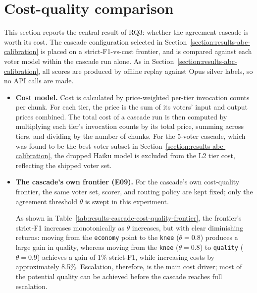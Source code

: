 \section{Cost-quality comparison}\label{section:results-cost-quality-comparison}

This section reports the central result of RQ3: whether the agreement cascade is worth its cost. The cascade configuration selected in Section~\ref{section:results-abc-calibration} is placed on a strict-F1-vs-cost frontier, and is compared against each voter model within the cascade run alone. As in Section~\ref{section:results-abc-calibration}, all scores are produced by offline replay against Opus silver labels, so no API calls are made.

\begin{itemize}[label={},leftmargin=1.5em]

    \item \textbf{Cost model.} Cost is calculated by price-weighted per-tier invocation counts per chunk. For each tier, the price is the sum of its voters' input and output prices combined. The total cost of a cascade run is then computed by multiplying each tier's invocation counts by its total price, summing across tiers, and dividing by the number of chunks. For the 5-voter cascade, which was found to be the best voter subset in Section~\ref{section:results-abc-calibration}, the dropped Haiku model is excluded from the L2 tier cost, reflecting the shipped voter set.

    \item \textbf{The cascade's own frontier (E09).} For the cascade's own cost-quality frontier, the same voter set, scorer, and routing policy are kept fixed; only the agreement threshold $\theta$ is swept in this experiment. 

    As shown in Table~\ref{tab:results-cascade-cost-quality-frontier}, the frontier's strict-F1 increases monotonically as $\theta$ increases, but with clear diminishing returns: moving from the \texttt{economy} point to the \texttt{knee} ($\theta = 0.8$) produces a large gain in quality, whereas moving from the \texttt{knee} ($\theta = 0.8$) to \texttt{quality} ($\theta = 0.9$) achieves a gain of 1\% strict-F1, while increasing costs by approximately 8.5\%. Escalation, therefore, is the main cost driver; most of the potential quality can be achieved before the cascade reaches full escalation.


\end{itemize}
